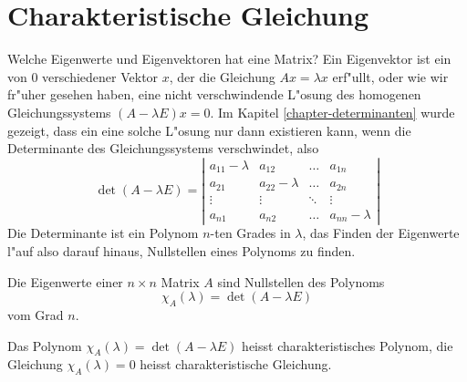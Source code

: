 \section{Charakteristische Gleichung}
Welche Eigenwerte und Eigenvektoren hat eine Matrix? Ein Eigenvektor 
ist ein von $0$ verschiedener Vektor $x$, der die Gleichung
$Ax=\lambda x$ erf"ullt, oder wie wir fr"uher gesehen haben,
eine nicht verschwindende L"osung des homogenen Gleichungssystems
$(A-\lambda E)x=0$.
Im Kapitel \ref{chapter-determinanten} wurde gezeigt, dass ein eine solche
L"osung nur dann existieren kann, wenn die Determinante des Gleichungssystems
verschwindet, also
$$\det(A-\lambda E)=
\left|
\begin{matrix}
a_{11}-\lambda&a_{12}&\dots&a_{1n}\\
a_{21}&a_{22}-\lambda&\dots&a_{2n}\\
\vdots&\vdots&\ddots&\vdots\\
a_{n1}&a_{n2}&\dots&a_{nn}-\lambda
\end{matrix}
\right|
$$
Die Determinante ist ein Polynom $n$-ten Grades in $\lambda$, das Finden der
Eigenwerte l"auf also darauf hinaus, Nullstellen eines Polynoms zu finden.
\begin{satz}
Die Eigenwerte einer $n\times n$ Matrix $A$ sind Nullstellen des
Polynoms
$$
\chi_A(\lambda)=\det(A-\lambda E)
$$
vom Grad $n$.
\end{satz}
\begin{definition}
Das Polynom $\chi_A(\lambda)=\det(A-\lambda E)$ heisst
charakteristisches Polynom,
die Gleichung $\chi_A(\lambda)=0$ heisst 
charakteristische Gleichung.
\end{definition}

